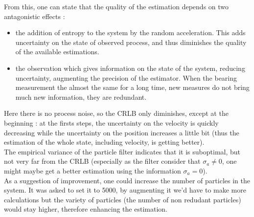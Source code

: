 \documentclass[english,DIV=13]{scrreprt}
\begin{document}
From this, one can state that the quality of the estimation depends on two antagonistic effects : 
\begin{itemize}
\item the addition of entropy to the system by the random acceleration. This adds uncertainty on the
    state of observed process, and thus diminishes the quality of the available estimations.
\item the observation which gives information on the state of the system, reducing uncertainty,
    augmenting the precision of the estimator. When the bearing measurement the almost the same for
        a long time, new measures do not bring much new information, they are redundant.
\end{itemize}
Here there is no process noise, so the CRLB only diminishes, except at the beginning : at the firsts steps,
the uncertainty on the velocity is quickly decreasing while the uncertainty on the position increases a little bit
(thus the estimation of the whole state, including velocity, is getting better).\\


The empirical variance of the particle filter indicates that it is suboptimal, but not very far from the CRLB
(especially as the filter consider that $\sigma_a \neq 0$, one might maybe get a better estimation using
the information $\sigma_a = 0$).\\

As a suggestion of improvement, one could increase the number of particles in the system. It was asked to set it to 5000, 
by augmenting it we'd have to make more calculations but the variety of particles (the number of non redudant particles)
would stay higher, therefore enhancing the estimation.
\end{document}

